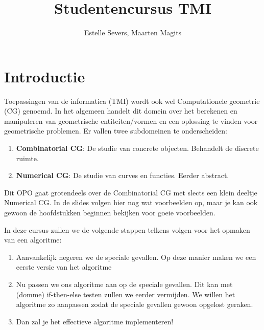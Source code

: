 \documentclass[12pt,a4paper]{article}
\author{Estelle Severs, Maarten Magits}
\title{Studentencursus TMI}
\begin{document}
	\maketitle
	\tableofcontents
	\section*{Introductie}
	Toepassingen van de informatica (TMI) wordt ook wel Computationele geometrie (CG) genoemd.
	In het algemeen handelt dit domein over het berekenen en manipuleren van geometrische entiteiten/vormen en een oplossing te vinden voor geometrische problemen.
	Er vallen twee subdomeinen te onderscheiden:
	\begin{enumerate}
		\item \textbf{Combinatorial CG}: De studie van concrete objecten. Behandelt de discrete ruimte.
		\item \textbf{Numerical CG}: De studie van curves en functies. Eerder abstract.
	\end{enumerate}
	Dit OPO gaat grotendeels over de Combinatorial CG met slects een klein deeltje Numerical CG. In de slides volgen hier nog wat voorbeelden op, maar je kan ook gewoon de hoofdstukken beginnen bekijken voor goeie voorbeelden. 
	
	In deze cursus zullen we de volgende stappen telkens volgen voor het opmaken van een algoritme: 
	\begin{enumerate}
		\item Aanvankelijk negeren we de speciale gevallen. Op deze manier maken we een eerste versie van het algoritme
		\item Nu passen we ons algoritme aan op de speciale gevallen. Dit kan met (domme) if-then-else testen zullen we eerder vermijden. We willen het algoritme zo aanpassen zodat de speciale gevallen gewoon opgelost geraken. 
		\item Dan zal je het effectieve algoritme implementeren!
	\end{enumerate}
	
	
\end{document}
